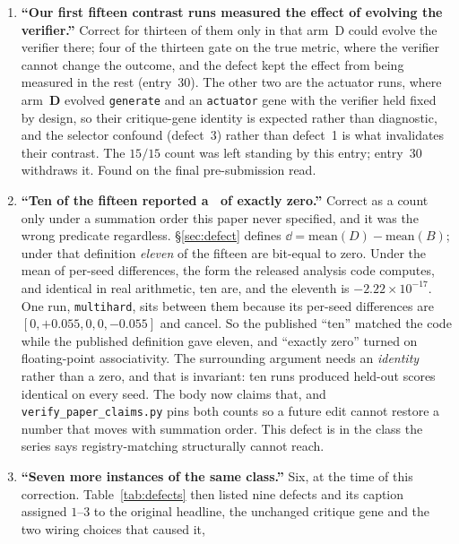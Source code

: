\documentclass[11pt]{article}
\begin{document}
\begin{enumerate}
    them the original ten. Found on the third pre-submission read, by comparing every run's own
    \texttt{meta.generated} against the commit dates of the registrations that name it.
  \item \textbf{``Our first fifteen contrast runs measured the effect of evolving the
    verifier.''} Correct for thirteen of them only in that arm~D could evolve the verifier there;
    four of the thirteen gate on the true metric, where the verifier cannot change the outcome, and
    the defect kept the effect from being measured in the rest (entry~30). The other two are the
    actuator runs, where
    arm~\textbf{D} evolved \texttt{generate} and an \texttt{actuator} gene with the verifier
    held fixed by design, so their critique-gene identity is expected rather than diagnostic, and
    the selector confound (defect~3) rather than defect~1 is what invalidates their contrast. The
    $15/15$ count was left standing by this entry; entry~30 withdraws it. Found on the final
    pre-submission read.
  \item \textbf{``Ten of the fifteen reported a \dd\ of exactly zero.''} Correct as a count only
    under a summation order this paper never specified, and it was the wrong predicate regardless.
    \S\ref{sec:defect} defines $\dd = \mathrm{mean}(D) - \mathrm{mean}(B)$; under that definition
    \emph{eleven} of the fifteen are bit-equal to zero. Under the mean of per-seed differences,
    the form the released analysis code computes, and identical in real arithmetic, ten are, and
    the eleventh is $-2.22 \times 10^{-17}$. One run, \texttt{multihard}, sits between them because
    its per-seed differences are $[0, +0.055, 0, 0, -0.055]$ and cancel. So the published ``ten''
    matched the code while the published definition gave eleven, and ``exactly zero'' turned on
    floating-point associativity.
    The surrounding argument needs an \emph{identity} rather than a zero, and that is invariant:
    ten runs produced held-out scores identical on every seed. The body now claims that, and
    \texttt{verify\_paper\_claims.py} pins both counts so a future edit cannot restore a number that
    moves with summation order. This defect is in the class the series says registry-matching
    structurally cannot reach.
  \item \textbf{``Seven more instances of the same class.''} Six, at the time of this correction.
    Table~\ref{tab:defects} then listed nine defects and its caption assigned $1$--$3$ to the
    original headline, the unchanged critique gene and the two wiring choices that caused it,

\end{enumerate}
\end{document}
